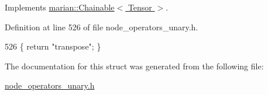 Implements \hyperlink{classmarian_1_1Chainable_a2b7a5cbdac7a7d3bd7d781a6ff148fc3}{marian\+::\+Chainable$<$ Tensor $>$}.



Definition at line 526 of file node\+\_\+operators\+\_\+unary.\+h.


\begin{DoxyCode}
526 \{ \textcolor{keywordflow}{return} \textcolor{stringliteral}{"transpose"}; \}
\end{DoxyCode}


The documentation for this struct was generated from the following file\+:\begin{DoxyCompactItemize}
\item 
\hyperlink{node__operators__unary_8h}{node\+\_\+operators\+\_\+unary.\+h}\end{DoxyCompactItemize}

